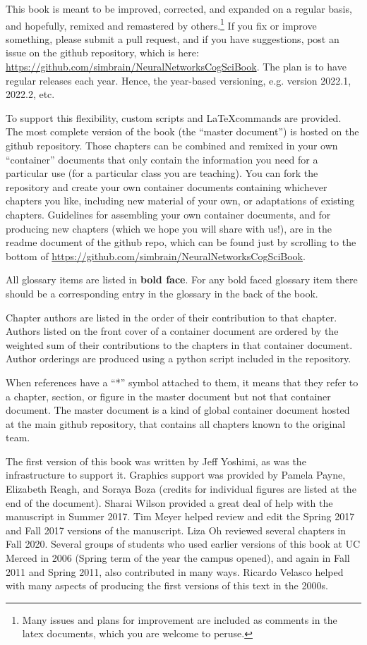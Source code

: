This book is meant to be improved, corrected, and expanded on a regular basis, and hopefully, remixed and remastered by others.\footnote{Many issues and plans for improvement are included as comments in the latex documents, which you are welcome to peruse.} If you fix or improve something, please submit a pull request, and if you have suggestions, post an issue on the github repository, which is here: \url{https://github.com/simbrain/NeuralNetworksCogSciBook}. The plan is to have regular releases each year. Hence, the year-based versioning, e.g. version 2022.1, 2022.2, etc.

To support this flexibility, custom scripts and \LaTeX commands are provided. The most complete version of the book (the ``master document'') is hosted on the github repository. Those chapters can be combined and remixed in your own ``container'' documents that only contain the information you need for a particular use (\eg for a particular class you are teaching). You can fork the repository and  create your own container documents containing whichever chapters you like, including new material of your own, or adaptations of existing chapters. Guidelines for assembling your own container documents, and for producing new chapters (which we hope you will share with us!), are in the readme document of the github repo, which can be found just by scrolling to the bottom of \url{https://github.com/simbrain/NeuralNetworksCogSciBook}.

All glossary items are listed in \textbf{bold face}. For any bold faced glossary item there should be a corresponding entry in the glossary in the back of the book.

Chapter authors are listed in the order of their contribution to that chapter. Authors listed on the front cover of a container document are ordered by the weighted sum of their contributions to the chapters in that container document. Author orderings are produced using a python script included in the repository.

When references have a ``*'' symbol attached to them, it means that they refer to a chapter, section, or figure in the master document but not that container document. The master document is a kind of global container document hosted at the main github repository, that contains all chapters known to the original team.

The first version of this book was written by Jeff Yoshimi, as was the infrastructure to support it. Graphics support was provided by Pamela Payne, Elizabeth Reagh, and Soraya Boza (credits for individual figures are listed at the end of the document). Sharai Wilson provided a great deal of help with the manuscript in Summer 2017. Tim Meyer helped review and edit the Spring 2017 and Fall 2017 versions of the manuscript. Liza Oh reviewed several chapters in Fall 2020. Several groups of students who used earlier versions of this book at UC Merced in 2006 (Spring term of the year the campus opened), and again in Fall 2011 and Spring 2011, also contributed in many ways. Ricardo Velasco helped with many aspects of producing the first versions of this text in the 2000s.

